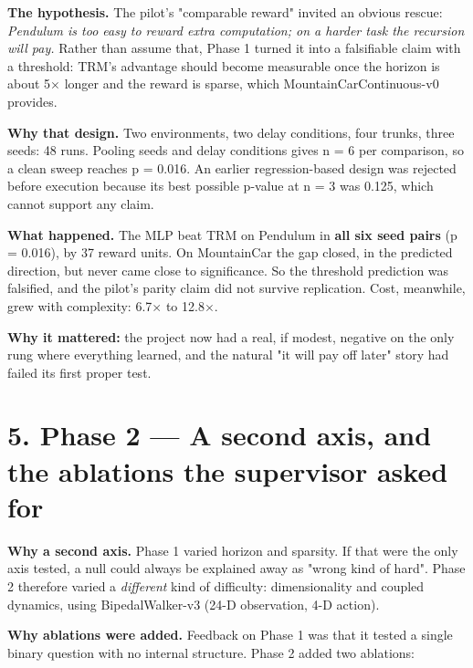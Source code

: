 \documentclass[11pt]{article}
\begin{document}
\textbf{The hypothesis.} The pilot's "comparable reward" invited an obvious rescue: \emph{Pendulum is too easy to reward extra computation; on a harder task the recursion will pay.} Rather than assume that, Phase 1 turned it into a falsifiable claim with a threshold: TRM's advantage should become measurable once the horizon is about 5$\times$ longer and the reward is sparse, which MountainCarContinuous-v0 provides.



\textbf{Why that design.} Two environments, two delay conditions, four trunks, three seeds: 48 runs. Pooling seeds and delay conditions gives n = 6 per comparison, so a clean sweep reaches p = 0.016. An earlier regression-based design was rejected before execution because its best possible p-value at n = 3 was 0.125, which cannot support any claim.



\textbf{What happened.} The MLP beat TRM on Pendulum in \textbf{all six seed pairs} (p = 0.016), by 37 reward units. On MountainCar the gap closed, in the predicted direction, but never came close to significance. So the threshold prediction was falsified, and the pilot's parity claim did not survive replication. Cost, meanwhile, grew with complexity: 6.7$\times$ to 12.8$\times$.



\textbf{Why it mattered:} the project now had a real, if modest, negative on the only rung where everything learned, and the natural "it will pay off later" story had failed its first proper test.



\section*{5. Phase 2 --- A second axis, and the ablations the supervisor asked for}



\textbf{Why a second axis.} Phase 1 varied horizon and sparsity. If that were the only axis tested, a null could always be explained away as "wrong kind of hard". Phase 2 therefore varied a \emph{different} kind of difficulty: dimensionality and coupled dynamics, using BipedalWalker-v3 (24-D observation, 4-D action).



\textbf{Why ablations were added.} Feedback on Phase 1 was that it tested a single binary question with no internal structure. Phase 2 added two ablations:
\end{document}

